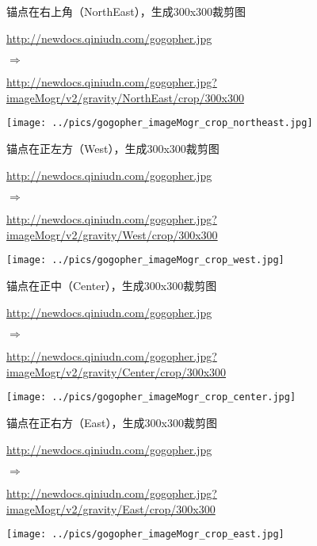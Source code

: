 \documentclass[11pt, oneside]{book}
\newcommand{\qsym}[1]{
\footnotesize
\noindent
#1\par
\normalsize
}
\newcommand{\qsamplelink}[1]{
\vspace{0.2em}
\noindent
#1\par
\vspace{0.1em}
}
\newcommand{\qurl}[1]{\footnotesize\url{#1}\normalsize}
\begin{document}
\begin{sample}
  \caption{锚点在右上角（NorthEast），生成300x300裁剪图}
    \qsamplelink{\qurl{http://newdocs.qiniudn.com/gogopher.jpg}}
    \qsym{$\Rightarrow$}
    \qsamplelink{\qurl{http://newdocs.qiniudn.com/gogopher.jpg?imageMogr/v2/gravity/NorthEast/crop/300x300}}

    \begin{center}
      \texttt{[image: ../pics/gogopher\_imageMogr\_crop\_northeast.jpg]}
    \end{center}
  \label{imageMogr-crop-northeast}
\end{sample}

\begin{sample}
  \caption{锚点在正左方（West），生成300x300裁剪图}
    \qsamplelink{\qurl{http://newdocs.qiniudn.com/gogopher.jpg}}
    \qsym{$\Rightarrow$}
    \qsamplelink{\qurl{http://newdocs.qiniudn.com/gogopher.jpg?imageMogr/v2/gravity/West/crop/300x300}}

    \begin{center}
      \texttt{[image: ../pics/gogopher\_imageMogr\_crop\_west.jpg]}
    \end{center}
  \label{imageMogr-crop-west}
\end{sample}

\begin{sample}
  \caption{锚点在正中（Center），生成300x300裁剪图}
    \qsamplelink{\qurl{http://newdocs.qiniudn.com/gogopher.jpg}}
    \qsym{$\Rightarrow$}
    \qsamplelink{\qurl{http://newdocs.qiniudn.com/gogopher.jpg?imageMogr/v2/gravity/Center/crop/300x300}}

    \begin{center}
      \texttt{[image: ../pics/gogopher\_imageMogr\_crop\_center.jpg]}
    \end{center}
  \label{imageMogr-crop-center}
\end{sample}

\begin{sample}
  \caption{锚点在正右方（East），生成300x300裁剪图}
    \qsamplelink{\qurl{http://newdocs.qiniudn.com/gogopher.jpg}}
    \qsym{$\Rightarrow$}
    \qsamplelink{\qurl{http://newdocs.qiniudn.com/gogopher.jpg?imageMogr/v2/gravity/East/crop/300x300}}

    \begin{center}
      \texttt{[image: ../pics/gogopher\_imageMogr\_crop\_east.jpg]}
    \end{center}
  \label{imageMogr-crop-east}
\end{sample}
\end{document}
